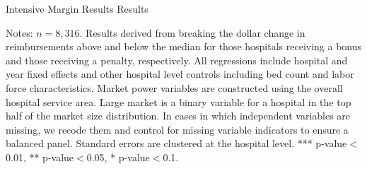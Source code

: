 \documentclass[12pt]{article}
\begin{document}
\newpage
{}
\setlength{\captionmargin}{.5 \textwidth} \addtolength{\captionmargin}{-.5\wd\gfxbox}
\begin{table}[!h]
\centering
\caption{Intensive Margin Results Results}
\label{tab:int}
\usebox{\gfxbox}
\par
\begin{minipage}{\wd\gfxbox}
\footnotesize
Notes: $n=8,316$.  Results derived from breaking the dollar change in reimbursements above and below the median for those hospitals receiving a bonus and those receiving a penalty, respectively.  All regressions include hospital and year fixed effects and other hospital level controls including bed count and labor force characteristics.  Market power variables are constructed using the overall hospital service area.  Large market is a binary variable for a hospital in the top half of the market size distribution.  In cases in which independent variables are missing, we recode them and control for missing variable indicators to ensure a balanced panel.  Standard errors are clustered at the hospital level.  *** p-value$<$0.01, ** p-value$<$0.05, * p-value$<$0.1.
\end{minipage}
\end{table}
\end{document}
